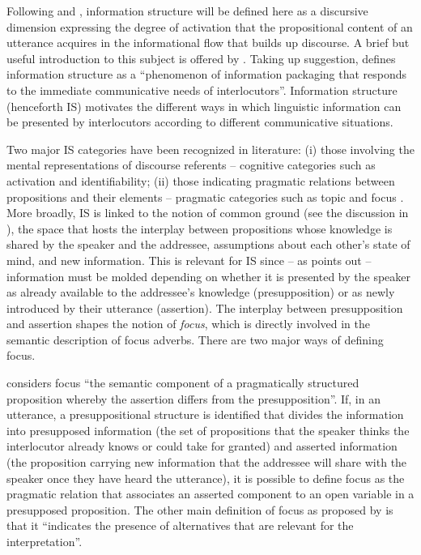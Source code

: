 Following \citet{Chafe1976,Chafe1987} and \citet{Lambrecht1994}, information structure will be defined here as a discursive dimension expressing the degree of activation that the propositional content of an utterance acquires in the informational flow that builds up discourse. A brief but useful introduction to this subject is offered by \citet{Krifka2008}. Taking up  suggestion, \citet[243]{Krifka2008} defines information structure as a “phenomenon of information packaging that responds to the immediate communicative needs of interlocutors”. Information structure (henceforth IS) motivates the different ways in which linguistic information can be presented by interlocutors according to different communicative situations.

Two major IS categories have been recognized in literature: (i) those involving the mental representations of discourse referents – cognitive categories such as activation and identifiability; (ii) those indicating pragmatic relations between propositions and their elements – pragmatic categories such as topic and focus \citep[36]{Lambrecht1994}. More broadly, IS is linked to the notion of common ground (see the discussion in ), the space that hosts the interplay between propositions whose knowledge is shared by the speaker and the addressee, assumptions about each other’s state of mind, and new information. This is relevant for IS since – as \citet[36]{Lambrecht1994} points out – information must be molded depending on whether it is presented by the speaker as already available to the addressee’s knowledge (presupposition) or as newly introduced by their utterance (assertion). The interplay between presupposition and assertion shapes the notion of \textit{focus}, which is directly involved in the semantic description of focus adverbs. There are two major ways of defining focus.

\citet[213]{Lambrecht1994} considers focus “the semantic component of a pragmatically structured proposition whereby the assertion differs from the presupposition”. If, in an utterance, a presuppositional structure is identified that divides the information into presupposed information (the set of propositions that the speaker thinks the interlocutor already knows or could take for granted) and asserted information (the proposition carrying new information that the addressee will share with the speaker once they have heard the utterance), it is possible to define focus as the pragmatic relation that associates an asserted component to an open variable in a presupposed proposition. The other main definition of focus as proposed by \citet[247]{Krifka2008} is that it “indicates the presence of alternatives that are relevant for the interpretation”.

